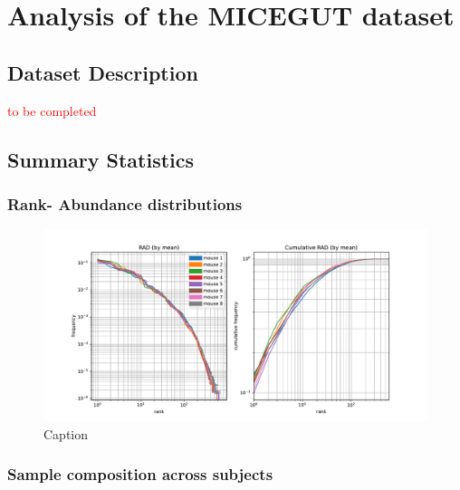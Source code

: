 \chapter{Analysis of the MICEGUT dataset}
\section{Dataset Description}
\textcolor{red}{to be completed}
\begin{figure}[H]
\centering
{}
\caption{}
\end{figure}

\newpage

\section{Summary Statistics}
\subsection{Rank- Abundance distributions}

\begin{figure}[H]
    \centering
    \includegraphics[width=\linewidth]{figures/chapter_2/RAD_mean.pdf}
    \caption{Caption}
    \label{fig:enter-label}
\end{figure}
\subsection{Sample composition across subjects}

